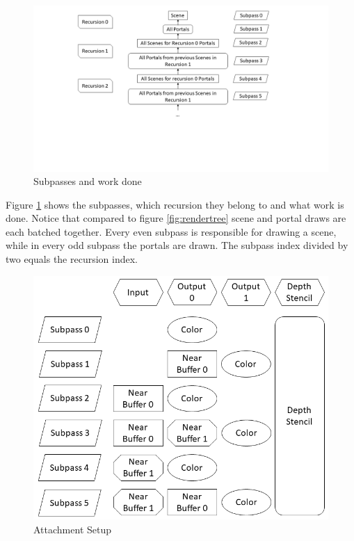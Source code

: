 \begin{figure}[h]
	\includegraphics[width=\linewidth]{images/renderpasses.png}
	\caption{Subpasses and work done}
	\label{fig:renderpasses}
\end{figure}


Figure \ref{fig:renderpasses} shows the subpasses, which recursion they belong to and what work is done. Notice that compared to figure \ref{fig:rendertree} scene and portal draws are each batched together. Every even subpass is responsible for drawing a scene, while in every odd subpass the portals are drawn. The subpass index divided by two equals the recursion index. 

\begin{figure}[h]
	\includegraphics[width=\linewidth]{images/attachmentsetup.png}
	\caption{Attachment Setup}
	\label{fig:attachments}
\end{figure}

